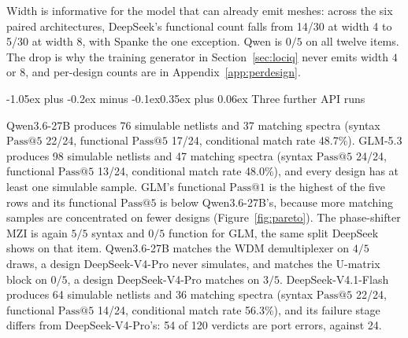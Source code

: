\documentclass[11pt]{article}
\makeatletter
\renewcommand\subsection{\@startsection{subsection}{2}{\z@}%
  {-1.05ex plus -0.2ex minus -0.1ex}{0.35ex plus 0.06ex}%
  {\normalfont\normalsize\bfseries}}
\newcommand{\passk}[1]{\mathrm{Pass@}#1}
\makeatother
\begin{document}
Width is informative for the model that can already emit meshes: across the six paired architectures, DeepSeek's functional count falls from 14/30 at width 4 to 5/30 at width 8, with Spanke the one exception.
Qwen is $0/5$ on all twelve items.
The drop is why the training generator in Section~\ref{sec:lociq} never emits width $4$ or $8$, and per-design counts are in Appendix~\ref{app:perdesign}.

\subsection{Three further API runs}
\label{sec:api}

Qwen3.6-27B produces 76 simulable netlists and 37 matching spectra (syntax $\passk{5}$ 22/24, functional $\passk{5}$ 17/24, conditional match rate 48.7\%).
GLM-5.3 produces 98 simulable netlists and 47 matching spectra (syntax $\passk{5}$ 24/24, functional $\passk{5}$ 13/24, conditional match rate 48.0\%), and every design has at least one simulable sample.
GLM's functional $\passk{1}$ is the highest of the five rows and its functional $\passk{5}$ is below Qwen3.6-27B's, because more matching samples are concentrated on fewer designs (Figure~\ref{fig:pareto}).
The phase-shifter MZI is again $5/5$ syntax and $0/5$ function for GLM, the same split DeepSeek shows on that item.
Qwen3.6-27B matches the WDM demultiplexer on $4/5$ draws, a design DeepSeek-V4-Pro never simulates, and matches the U-matrix block on $0/5$, a design DeepSeek-V4-Pro matches on $3/5$.
DeepSeek-V4.1-Flash produces 64 simulable netlists and 36 matching spectra (syntax $\passk{5}$ 22/24, functional $\passk{5}$ 14/24, conditional match rate 56.3\%), and its failure stage differs from DeepSeek-V4-Pro's: 54 of 120 verdicts are port errors, against 24.
\end{document}
